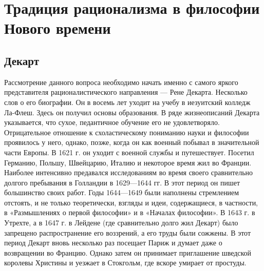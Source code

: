\documentclass[12pt]{article}
\begin{document}
\newpage
\section{Традиция рационализма в философии Нового времени}
\subsection{Декарт}
Рассмотрение данного вопроса необходимо начать именно с самого яркого представителя рационалистического
направления --- Рене Декарта. Несколько слов о его биографии. Он в восемь лет уходит на учебу в иезуитский
колледж Ла-Флеш. Здесь он получил основы образования. В ряде жизнеописаний Декарта указывается, что
сухое, педантичное обучение его не удовлетворяло. Отрицательное отношение к схоластическому пониманию
науки и философии проявилось у него, однако, позже, когда он как военный побывал в значительной части
Европы. В 1621 г. он уходит с военной службы и путешествует. Посетил Германию, Польшу, Швейцарию,
Италию и некоторое время жил во Франции. Наиболее интенсивно предавался исследованиям во время своего
сравнительно долгого пребывания в Голландии в 1629—1644 гг. В этот период он пишет большинство своих
работ. Годы 1644—1649 были наполнены стремлением отстоять, и не только теоретически, взгляды и идеи,
содержащиеся, в частности, в «Размышлениях о первой философии» и в «Началах философии». В 1643 г. в
Утрехте, а в 1647 г. в Лейдене (где сравнительно долго жил Декарт) было запрещено распространение его
воззрений, а его труды были сожжены. В этот период Декарт вновь несколько раз посещает Париж и думает
даже о возвращении во Францию. Однако затем он принимает приглашение шведской королевы Христины и
уезжает в Стокгольм, где вскоре умирает от простуды.
\end{document}
